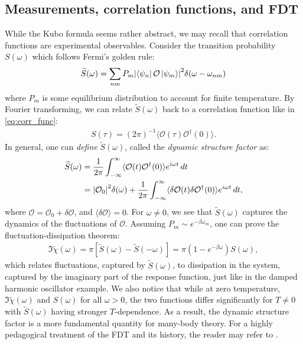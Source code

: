 \documentclass[reprint,
nofootinbib,
amsmath,amssymb,
aps]{revtex4-1}
\newcommand{\be}{\beta}
\newcommand{\f}[2]{\frac{#1}{#2}}
\begin{document}
\subsection{Measurements, correlation functions, and FDT}
While the Kubo formula seems rather abstract, we may recall that correlation functions are experimental observables. Consider the transition probability $S(\omega)$ which follows Fermi's golden rule:
\begin{align*}
\widetilde{S}(\omega) = \sum_{nm} P_m \abs{ \bra{\psi_n} \mathcal{O} \ket{\psi_m}  }^2  \delta(\omega - \omega_{nm}) 
\end{align*}
where $P_m$ is some equilibrium distribution to account for finite temperature. By Fourier transforming, we can relate $\widetilde{S}(\omega)$ back to a correlation function like in \eqref{eq:corr_func}:
\begin{align*}
S(\tau) = (2\pi)^{-1}\langle \mathcal{O}(\tau) \mathcal{O}^\dagger(0) \rangle. 
\end{align*}
In general, one can \textit{define} $\widetilde{S}(\omega)$, called the \textit{dynamic structure factor} as:
\begin{align*}
\widetilde{S}(\omega) 
&= \f{1}{2\pi}\int_{-\infty}^\infty \langle \mathcal{O}(t) \mathcal{O}^\dagger (0) \rangle e^{i \omega t }\,dt\\
&= \abs{\mathcal{O}_0}^2 \delta(\omega) + \f{1}{2\pi} \int_{-\infty}^\infty \langle \delta \mathcal{O}(t) \delta \mathcal{O}^\dagger (0) \rangle e^{i\omega t }\,dt,
\end{align*}
where $ \mathcal{O} = \mathcal{O}_0 + \delta \mathcal{O}$, and $\langle \delta \mathcal{O} \rangle = 0$. For $ \omega \neq 0$, we see that $\widetilde{S}(\omega)$ captures the dynamics of the fluctuations of $\mathcal{O}$. Assuming $P_m \sim e^{-\be \omega_m}$, one can prove the fluctuation-dissipation theorem:
\begin{align*}
\Im \widetilde{\chi}(\omega) = \pi[\widetilde{S}(\omega) - \widetilde{S}(-\omega)] = \pi (1 - e^{-\be \omega}) S(\omega),
\end{align*}
which relates fluctuations, captured by $\widetilde{S}(\omega)$, to dissipation in the system, captured by the imaginary part of the response function, just like in the damped harmonic oscillator example. We also notice that while at zero temperature, $\Im \widetilde{\chi}(\omega)$ and $S(\omega)$ for all $\omega >0$, the two functions differ significantly for $T \neq 0$ with $\widetilde{S}(\omega)$ having stronger $T$-dependence. As a result, the dynamic structure factor is a more fundamental quantity for many-body theory. For a highly pedagogical treatment of the FDT and its history, the reader may refer to \cite{marconi2008fluctuation}.
\end{document}
